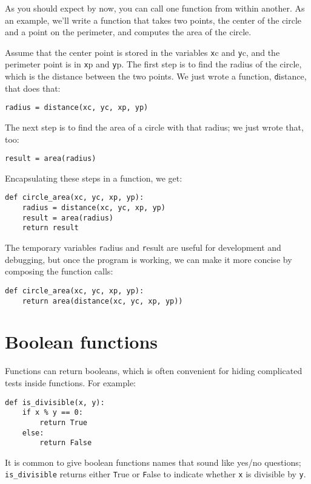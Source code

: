\documentclass[
DIV=11,
fontsize=13,
twoside,
headinclude=false,
titlepage=firstiscover,
abstract=true,
headsepline=true,
footsepline=true,
chapterprefix=true, %
headings=big,
bibliography=totoc,%
captions=tableheading
]{scrbook}
\theoremstyle{definition}
\begin{document}
As you should expect by now, you can call one function from within
another.  As an example, we'll write a function that takes two points,
the center of the circle and a point on the perimeter, and computes
the area of the circle.

Assume that the center point is stored in the variables {\texttt xc} and
{\texttt yc}, and the perimeter point is in {\texttt xp} and {\texttt yp}. The
first step is to find the radius of the circle, which is the distance
between the two points.  We just wrote a function, {\texttt
distance}, that does that:

\begin{lstlisting}
radius = distance(xc, yc, xp, yp)
\end{lstlisting}
%
The next step is to find the area of a circle with that radius;
we just wrote that, too:

\begin{lstlisting}
result = area(radius)
\end{lstlisting}
%
Encapsulating these steps in a function, we get:

\begin{lstlisting}
def circle_area(xc, yc, xp, yp):
    radius = distance(xc, yc, xp, yp)
    result = area(radius)
    return result
\end{lstlisting}
%
The temporary variables {\texttt radius} and {\texttt result} are useful for
development and debugging, but once the program is working, we can
make it more concise by composing the function calls:

\begin{lstlisting}
def circle_area(xc, yc, xp, yp):
    return area(distance(xc, yc, xp, yp))
\end{lstlisting}
%

\section{Boolean functions}
\label{boolean}

Functions can return booleans, which is often convenient for hiding
complicated tests inside functions.  
For example:

\begin{lstlisting}
def is_divisible(x, y):
    if x % y == 0:
        return True
    else:
        return False
\end{lstlisting}
%
It is common to give boolean functions names that sound like yes/no
questions; \verb"is_divisible" returns either {\texttt True} or {\texttt False}
to indicate whether {\texttt x} is divisible by {\texttt y}.
\end{document}
